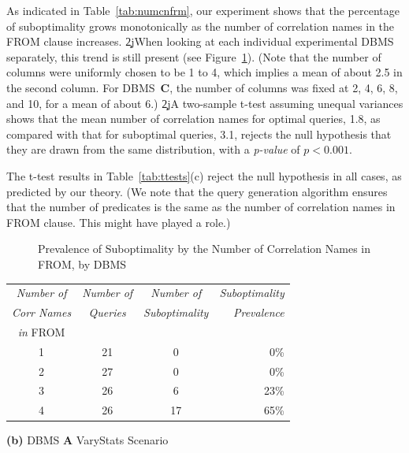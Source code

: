 As indicated in Table~\ref{tab:numcnfrm}, our experiment shows that the percentage of suboptimality grows
monotonically as the number of correlation names in the FROM clause
increases. \c2j{}{When looking at each individual experimental DBMS separately,
this trend is still present (see Figure~\ref{fig:numcnfrm}). (Note that the
number of columns were uniformly chosen to be 1 to 4, which implies a mean
of about 2.5 in the second column. For DBMS~{\bf C}, the number of columns
was fixed at 2, 4, 6, 8, and 10, for a mean of about 6.)} \c2j{A two-sample
  \hbox{t-test} assuming unequal variances shows that the mean
  number of correlation names for optimal
  queries, 1.8, as compared with that for suboptimal queries, 3.1, rejects
  the null hypothesis that they are drawn from the same distribution, with a
  {\em p-value} of $p<0.001$.}{The t-test results
in Table~\ref{tab:ttests}(c) reject the null hypothesis in all cases, 
as predicted by our theory. (We note that the query generation algorithm 
ensures that the number of predicates is the same as the number of 
correlation names in FROM clause. This might have played a role.)

\begin{figure}[t]
\begin{center}
\end{center}
\caption{Prevalence of Suboptimality by the Number of Correlation Names in
FROM, by DBMS\label{fig:numcnfrm}}
\end{figure}

\begin{table}[t]
\begin{center}
\begin{tabular}{c|c|c|r}
{\em Number of} & {\em Number of} & {\em Number of} & \multicolumn{1}{|c}{\em Suboptimality}\\
{\em Corr Names}&{\em Queries}&{\em Suboptimality}&{\em Prevalence}\\
{\em in} FROM&&&\\
\hline
1 & 21 & 0 & 0\%\\
2 & 27 & 0 & 0\%\\
3 & 26 & 6 & 23\%\\
4 & 26 & 17 & 65\%
\end{tabular}

\vspace*{1em}

{\bf (b)} DBMS {\bf A} VaryStats Scenario

\vspace*{1em}


\end{center}
\end{table}}
